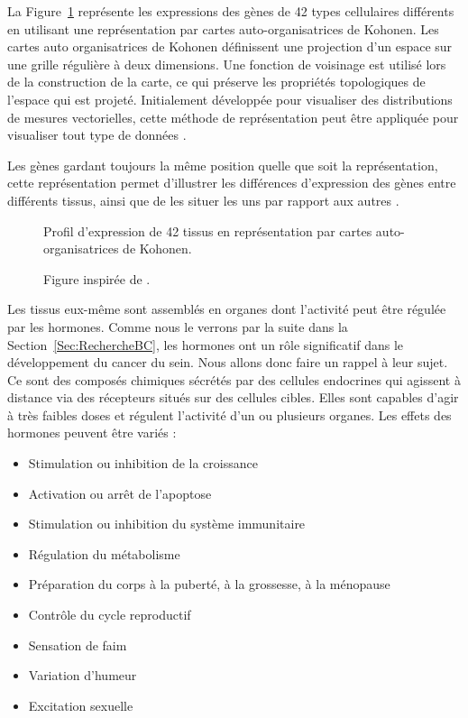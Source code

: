 			La Figure~\ref{fig:Wirth2011} représente les expressions des gènes de 42 types cellulaires différents en utilisant une représentation par cartes auto-organisatrices de Kohonen.
			Les cartes auto organisatrices de Kohonen définissent une projection d'un espace sur une grille régulière à deux dimensions. Une fonction de voisinage est utilisé lors de la construction de la carte, ce qui préserve les propriétés topologiques de l'espace qui est projeté. Initialement développée pour visualiser des distributions de mesures vectorielles, cette méthode de représentation peut être appliquée pour visualiser tout type de données \citep{Kohonen1982,Kohonen2007}.

			Les gènes gardant toujours la même position quelle que soit la représentation, cette représentation permet d'illustrer les différences d'expression des gènes entre différents tissus, ainsi que de les situer les uns par rapport aux autres \citep{Wirth2011}.

			\begin{figure}
				\begin{center}
					\def\svgwidth{\columnwidth}
					\caption{Profil d'expression de 42 tissus en représentation par cartes auto-organisatrices de Kohonen.}
					\label{fig:Wirth2011}
					\caption*{Figure inspirée de \citeauthor{Wirth2011}.}
				\end{center}
			\end{figure}


			Les tissus eux-même sont assemblés en organes dont l'activité peut être régulée par les hormones.
			Comme nous le verrons par la suite dans la Section~\ref{Sec:RechercheBC}, les hormones ont un rôle significatif dans le développement du cancer du sein.
			Nous allons donc faire un rappel à leur sujet.
			Ce sont des composés chimiques sécrétés par des cellules endocrines qui agissent à distance via des récepteurs situés sur des cellules cibles.
			Elles sont capables d'agir à très faibles doses et régulent l'activité d'un ou plusieurs organes.
			Les effets des hormones peuvent être variés :
			\begin{itemize}
					\item   Stimulation ou inhibition de la croissance
					\item   Activation ou arrêt de l'apoptose
					\item   Stimulation ou inhibition du système immunitaire
					\item   Régulation du métabolisme
					\item   Préparation du corps à la puberté, à la grossesse, à la ménopause
					\item   Contrôle du cycle reproductif
					\item   Sensation de faim
					\item   Variation d'humeur
					\item   Excitation sexuelle
			\end{itemize}

